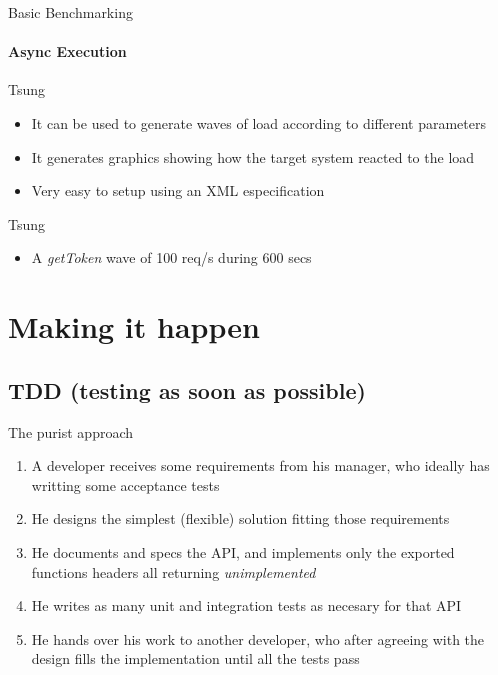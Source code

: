 \documentclass[aspectratio=169]{beamer}
\begin{document}
\begin{frame}{Basic Benchmarking}
    \framesubtitle{Async Execution}
    
\end{frame}

\begin{frame}{Tsung}
    \begin{itemize}
    \item It can be used to generate waves of load according to different parameters
    \item It generates graphics showing how the target system reacted to the load
    \item Very easy to setup using an XML especification
    \end{itemize}
\end{frame}

\begin{frame}{Tsung}
    \begin{itemize}
    \item A \emph{getToken} wave of 100 req/s during 600 secs
    
    \end{itemize}
\end{frame}

\section*{Making it happen}
\label{making_it_happen}

\subsection*{TDD (testing as soon as possible)}
\label{tdd}

\begin{frame}{The purist approach}
    \begin{enumerate}
    \pause
    \item A developer receives some requirements from his manager, who ideally has writting some acceptance tests
    \pause
    \item He designs the simplest (flexible) solution fitting those requirements
    \pause
    \item He documents and specs the API, and implements only the exported functions headers all returning \emph{unimplemented}
    \pause
    \item He writes as many unit and integration tests as necesary for that API
    \pause
    \item He hands over his work to another developer, who after agreeing with the design fills the implementation until
    all the tests pass
    \end{enumerate}
\end{frame}
\end{document}
